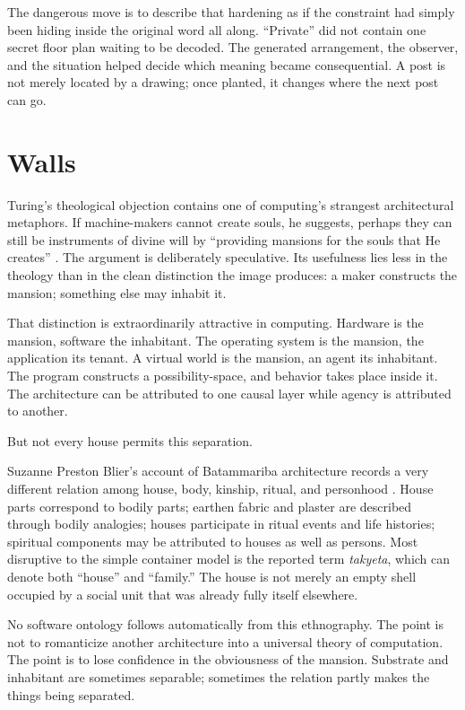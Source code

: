 \documentclass[11pt]{article}
\begin{document}
The dangerous move is to describe that hardening as if the constraint had simply been hiding inside the original word all along. ``Private'' did not contain one secret floor plan waiting to be decoded. The generated arrangement, the observer, and the situation helped decide which meaning became consequential. A post is not merely located by a drawing; once planted, it changes where the next post can go.

\section*{Walls}

Turing's theological objection contains one of computing's strangest architectural metaphors. If machine-makers cannot create souls, he suggests, perhaps they can still be instruments of divine will by ``providing mansions for the souls that He creates'' \cite{turing1950}. The argument is deliberately speculative. Its usefulness lies less in the theology than in the clean distinction the image produces: a maker constructs the mansion; something else may inhabit it.

That distinction is extraordinarily attractive in computing. Hardware is the mansion, software the inhabitant. The operating system is the mansion, the application its tenant. A virtual world is the mansion, an agent its inhabitant. The program constructs a possibility-space, and behavior takes place inside it. The architecture can be attributed to one causal layer while agency is attributed to another.

But not every house permits this separation.

Suzanne Preston Blier's account of Batammariba architecture records a very different relation among house, body, kinship, ritual, and personhood \cite{blier1983}. House parts correspond to bodily parts; earthen fabric and plaster are described through bodily analogies; houses participate in ritual events and life histories; spiritual components may be attributed to houses as well as persons. Most disruptive to the simple container model is the reported term \emph{takyeta}, which can denote both ``house'' and ``family.'' The house is not merely an empty shell occupied by a social unit that was already fully itself elsewhere.

No software ontology follows automatically from this ethnography. The point is not to romanticize another architecture into a universal theory of computation. The point is to lose confidence in the obviousness of the mansion. Substrate and inhabitant are sometimes separable; sometimes the relation partly makes the things being separated.
\end{document}
